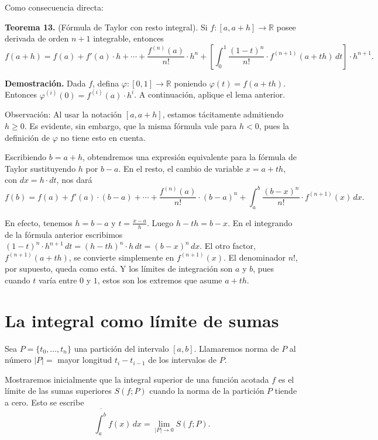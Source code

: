 \documentclass[12pt,oneside]{book}
\begin{document}
Como consecuencia directa:

\textbf{Teorema 13.} (Fórmula de Taylor con resto integral). Si \(f: [a, a + h] \to \mathbb{R}\) posee derivada de orden \(n+1\) integrable, entonces
\[
f(a + h) = f(a) + f'(a) \cdot h + \cdots + \frac{f^{(n)}(a)}{n!} \cdot h^n
+ \left[ \int_0^1 \frac{(1 - t)^n}{n!} \cdot f^{(n+1)}(a + th) \, dt \right] \cdot h^{n+1}.
\]

\textbf{Demostración.} Dada \(f\), defina \(\varphi: [0,1] \to \mathbb{R}\) poniendo \(\varphi(t) = f(a + th)\). Entonces \(\varphi^{(i)}(0) = f^{(i)}(a) \cdot h^i\). A continuación, aplique el lema anterior.

Observación: Al usar la notación \([a, a + h]\), estamos tácitamente admitiendo \(h \ge 0\). Es evidente, sin embargo, que la misma fórmula vale para \(h < 0\), pues la definición de \(\varphi\) no tiene esto en cuenta.

Escribiendo \(b = a + h\), obtendremos una expresión equivalente para la fórmula de Taylor sustituyendo \(h\) por \(b - a\). En el resto, el cambio de variable \(x = a + th\), con \(dx = h \cdot dt\), nos dará
\[
f(b) = f(a) + f'(a) \cdot (b - a) + \cdots + \frac{f^{(n)}(a)}{n!} \cdot (b - a)^n
+ \int_a^b \frac{(b - x)^n}{n!} \cdot f^{(n+1)}(x) \, dx.
\]

En efecto, tenemos \(h = b - a\) y \(t = \frac{x - a}{h}\). Luego \(h - th = b - x\). En el integrando de la fórmula anterior escribimos \((1 - t)^n \cdot h^{n+1} \, dt = (h - th)^n \cdot h \, dt = (b - x)^n \, dx\). El otro factor, \(f^{(n+1)}(a + th)\), se convierte simplemente en \(f^{(n+1)}(x)\). El denominador \(n!\), por supuesto, queda como está. Y los límites de integración son \(a\) y \(b\), pues cuando \(t\) varía entre \(0\) y \(1\), estos son los extremos que asume \(a + th\).

\section{La integral como límite de sumas}

Sea \(P = \{t_0, \ldots, t_n\}\) una partición del intervalo \([a, b]\). Llamaremos norma de \(P\) al número \(|P| =\) mayor longitud \(t_i - t_{i-1}\) de los intervalos de \(P\).

Mostraremos inicialmente que la integral superior de una función acotada \(f\) es el límite de las sumas superiores \(S(f; P)\) cuando la norma de la partición \(P\) tiende a cero. Esto se escribe
\[
\overline{\int_a^b} f(x) \, dx = \lim_{|P| \to 0} S(f; P).
\]
\end{document}
